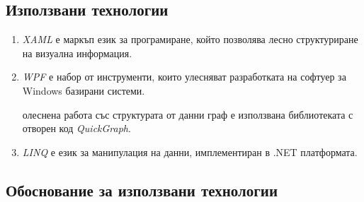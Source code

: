 \subsection{Използвани технологии}


\begin{enumerate}
  разработката на приложението е използвана интегрираната среда за разработка на софтуер \textit{Visual Studio 2017}. 
  програмен език е \textit{C Sharp}. 
  визуализацията на примитиви в 3D е използвана библиотеката с отворен код \textit{Helix Toolkit 3D}. Позволява достъп до вече настроен viewport, както и някои базови за работата с 3D обекти функции – ротация, транслация и скалиране.
 
 \item \textit{XAML} е маркъп език за програмиране, който позволява лесно структуриране на визуална информация.
 
 \item \textit{WPF} е набор от инструменти, които улесняват разработката на софтуер за Windows базирани системи.
 
  олеснена работа със структурата от данни граф е използвана библиотеката с отворен код \textit{QuickGraph}. 
 
 \item \textit{LINQ} е език за манипулация на данни, имплементиран в .NET платформата.
\end{enumerate}

\subsection{Обоснование за използвани технологии}

